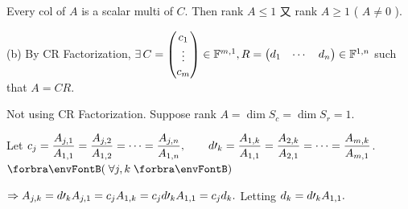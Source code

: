 \par\quad\Ha
{\Large\vspace{6pt}Every col of $A$ is a scalar multi of $C.$ Then rank $A\leqslant 1$ 又 rank $A\geqslant 1$ ( $A\neq 0$ ).}\vspace{6pt}\par\quad
(b) By CR Factorization, $\exists\,C=\begin{pmatrix}c_1 \\ \vdots \\ c_m \end{pmatrix}\in{\mathbb{F}}^{m,1},R=\begin{pmatrix} d_1 & \cdots & d_n\end{pmatrix}\in{\mathbb{F}}^{1,n}$ such that $A=CR.$\vspace{8pt}\par\quad\Hb
\Or Not using CR Factorization. Suppose rank $A=\dim S_c=\dim S_r=1.$\vspace{8pt}\par\quad\Hb
{\Large\vspace{6pt}Let $c_j={\displaystyle{\frac{A_{j,1}}{A_{1,1}}}}={\displaystyle{\frac{A_{j,2}}{A_{1,2}}}}=\dots={\displaystyle{\frac{A_{j,n}}{A_{1,n}}}},\qquad d\prime_k={\displaystyle{\frac{A_{1,k}}{A_{1,1}}}}={\displaystyle{\frac{A_{2,k}}{A_{2,1}}}}=\dots={\displaystyle{\frac{A_{m,k}}{A_{m,1}}}}$.\quad$\Par{\,\forall j,k\,}$}\par\vspace{6pt}\quad\Hb
{\Large\vspace{6pt}$\Rightarrow A_{j,k}=d\prime_k A_{j,1}=c_j A_{1,k}=c_j d\prime_k A_{1,1}=c_j d_k.$ Letting $d_k=d\prime_k A_{1,1}.$}\PfEnd
\SepLine[10pt]

